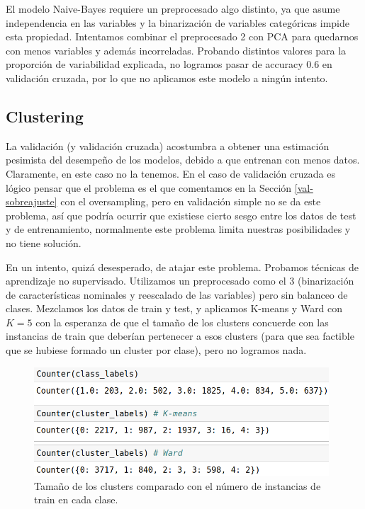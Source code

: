 \documentclass{article}
\begin{document}
El modelo Naive-Bayes requiere un preprocesado algo distinto, ya que
asume independencia en las variables y la binarización de variables
categóricas impide esta propiedad. Intentamos combinar el preprocesado
2 con PCA para quedarnos con menos variables y además
incorreladas. Probando distintos valores para la proporción de
variabilidad explicada, no logramos pasar de accuracy 0.6 en
validación cruzada, por lo que no aplicamos este modelo a ningún
intento.

\subsection{Clustering}

La validación (y validación cruzada) acostumbra a obtener una
estimación pesimista del desempeño de los modelos, debido a que
entrenan con menos datos. Claramente, en este caso no la tenemos. En
el caso de validación cruzada es lógico pensar que el problema es el
que comentamos en la Sección \ref{val-sobreajuste} con el
oversampling, pero en validación simple no se da este problema, así
que podría ocurrir que existiese cierto sesgo entre los datos de test
y de entrenamiento, normalmente este problema limita nuestras
posibilidades y no tiene solución.

En un intento, quizá desesperado, de atajar este problema. Probamos
técnicas de aprendizaje no supervisado. Utilizamos un preprocesado
como el 3 (binarización de características nominales y reescalado de
las variables) pero sin balanceo de clases. Mezclamos los datos de
train y test, y aplicamos K-means y Ward con $K=5$ con la esperanza de
que el tamaño de los clusters concuerde con las instancias de train
que deberían pertenecer a esos clusters (para que sea factible que se
hubiese formado un cluster por clase), pero no logramos nada.

\begin{figure}[H]
  \centering 
  \includegraphics[width=110mm]{imgs/cluster1}
  \caption{Tamaño de los clusters comparado con el número de
    instancias de train en cada clase.}
  \label{fig:cluster1}
\end{figure} \vspace{-3mm}
\end{document}
